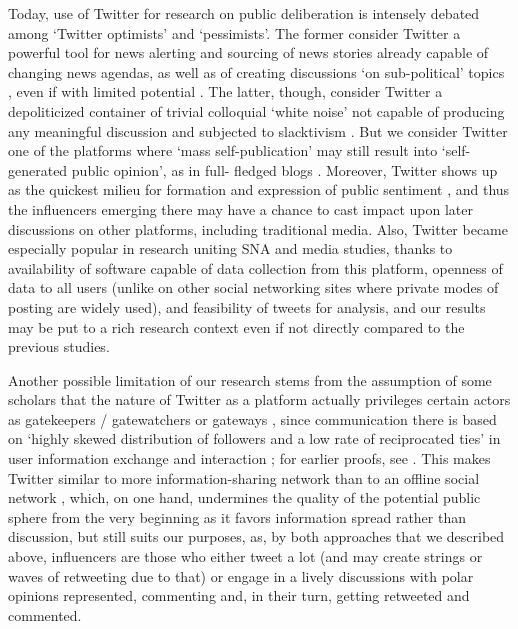 Today, use of Twitter for research on public deliberation is intensely debated among ‘Twitter optimists’ and ‘pessimists’. The former consider Twitter a powerful tool for news alerting \cite{ManciniMazzoni} and sourcing of news stories \cite{BroersmaGraham} already capable of changing news agendas, as well as of creating discussions ‘on sub-political’ topics \cite{Beck,LindgrenLundstrom}, even if with limited potential \cite[Ch. 8]{Fuchs}. The latter, though, consider Twitter a depoliticized container of trivial colloquial ‘white noise’ not capable of producing any meaningful discussion \cite{HartleyGreen} and subjected to slacktivism \cite{Morozov}. But we consider Twitter one of the platforms where ‘mass self-publication’ \cite{Castells2009} may still result into ‘self-generated public opinion’, as in full- fledged blogs \cite{KoltsovaKoltcov}. Moreover, Twitter shows up as the quickest milieu for formation and expression of public sentiment \cite{BrunsBurgessCrawford}, and thus the influencers emerging there may have a chance to cast impact upon later discussions on other platforms, including traditional media. Also, Twitter became especially popular in research uniting SNA and media studies, thanks to availability of software capable of data collection from this platform, openness of data to all users (unlike on other social networking sites where private modes of posting are widely used), and feasibility of tweets for analysis, and our results may be put to a rich research context even if not directly compared to the previous studies.

Another possible limitation of our research stems from the assumption of some scholars that the nature of Twitter as a platform actually privileges certain actors \cite{BastosRaimundoTravitzki} as gatekeepers \cite{White1950} / gatewatchers \cite{Bruns2005} or gateways  \cite[p.~262]{BastosRaimundoTravitzki}, since communication there is based on ‘highly skewed distribution of followers and a low rate of reciprocated ties’ in user information exchange and interaction \cite[p.~263]{BastosRaimundoTravitzki}; for earlier proofs, see \cite{BakshyHofmanMason,HubermanRomeroWu,KwakLeePark}. This makes Twitter similar to more information-sharing network than to an offline social network \cite[p.~264]{BastosRaimundoTravitzki}, which, on one hand, undermines the quality of the potential public sphere from the very beginning as it favors information spread rather than discussion, but still suits our purposes, as, by both approaches that we described above, influencers are those who either tweet a lot (and may create strings or waves of retweeting due to that) or engage in a lively discussions with polar opinions represented, commenting and, in their turn, getting retweeted and commented.

